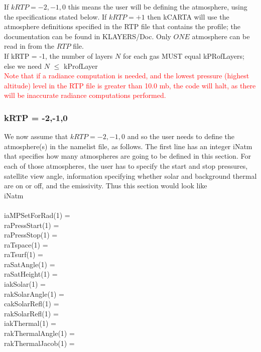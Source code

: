 \documentclass[12pt]{article}
\newcommand{\kc}{\textsf{kCARTA}\xspace}
\newcommand{\ttab}{\indent\indent}
\begin{document}
{\medskip
If $kRTP = -2,-1,0$ this means the user will be defining the atmosphere, 
using the specifications stated below. If $kRTP = +1$ then \kc will use the 
atmosphere definitions specified in the RTP file that contains the profile; 
the documentation can be found in KLAYERS/Doc. Only $ONE$ atmosphere can
be read in from the $RTP$ file. \\
If kRTP = -1, the number of layers $N$ for each gas MUST equal kPRofLayers; 
else we need $N$ $\le$ kProfLayer\\
\textcolor{red}
{Note that if a radiance computation is needed,
and the lowest pressure (highest altitude) level in the RTP file is greater 
than 10.0 mb, the code will halt, as there will be inaccurate radiance
computations performed.}

\medskip
\subsubsection{kRTP = -2,-1,0}
\noindent We now assume that $kRTP = -2,-1,0$ and so the user needs to define 
the atmosphere(s) in the namelist file, as follows. The first line has an 
integer {\sf iNatm} that specifies how many atmospheres are going 
to be defined in this section. For each of those atmospheres, the user
has to specify the start and stop pressures, satellite view angle, 
information specifying whether solar and background  thermal are on or off, 
and the emissivity. Thus this section would look like\\
{\sf
\ttab iNatm\\ 
\ttab \\
\ttab iaMPSetForRad(1)   = \\
\ttab raPressStart(1)    = \\
\ttab raPressStop(1)     = \\
\ttab raTspace(1)        = \\
\ttab raTsurf(1)         = \\
\ttab raSatAngle(1)      = \\
\ttab raSatHeight(1)     = \\
\ttab iakSolar(1)        = \\
\ttab rakSolarAngle(1)   = \\
\ttab cakSolarRefl(1)    = \\
\ttab rakSolarRefl(1)    = \\
\ttab iakThermal(1)      = \\
\ttab rakThermalAngle(1) = \\
\ttab rakThermalJacob(1) = \\
}}
\end{document}
